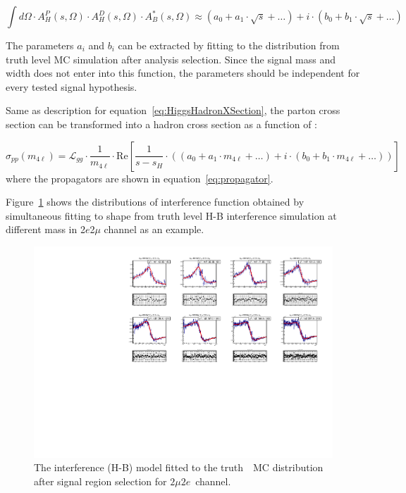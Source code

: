 \begin{equation}
    \int d \Omega \cdot A_H^P(s,\Omega)  \cdot A_H^D(s,\Omega) \cdot A^*_B(s,\Omega)  \approx  (a_0 + a_1 \cdot \sqrt{s} + \dots) + i \cdot (b_0 + b_1 \cdot \sqrt{s} + \dots)
\end{equation}

The parameters $a_i$ and $b_i$ can be extracted by fitting to the \mfl distribution from truth level MC simulation after analysis selection.
Since the signal mass and width does not enter into this function, the parameters should be independent for every tested signal hypothesis.

Same as description for equation~\ref{eq:HiggsHadronXSection}, the parton cross section can be transformed into a hadron cross section as a function of \mfl:

\begingroup
\small
\begin{equation} \label{eq:HBHadronXSection}
    \sigma_{pp} (m_{4\ell}) = \mathcal{L}_{gg} \cdot \frac{1}{m_{4\ell}} \cdot \mathrm{Re} \left [   \frac{1}{s-s_H}  \cdot  \left ( (a_0 + a_1 \cdot m_{4\ell} + \dots) + i \cdot (b_0 + b_1 \cdot m_{4\ell} + \dots) \right )\right ]
\end{equation}
\endgroup
where the propagators are shown in equation~\ref{eq:propagator}.

Figure~\ref{fig:HB_Int_2mu2e} shows the distributions of interference function obtained by simultaneous fitting to \mfl shape from truth level H-B interference simulation at different mass in 2$e$2$\mu$ channel as an example.

\begingroup
\small
\begin{figure}[!htbp]
    \centering
    \includegraphics[width=1.\textwidth]{figures/HMHZZ/signal/Interference/HB_Int_2mu2e.pdf}
    \caption{The interference (H-B) model fitted to the truth~\mfl~MC distribution after signal region selection for $2\mu2e$~channel. \label{fig:HB_Int_2mu2e} }
\end{figure}
\endgroup

